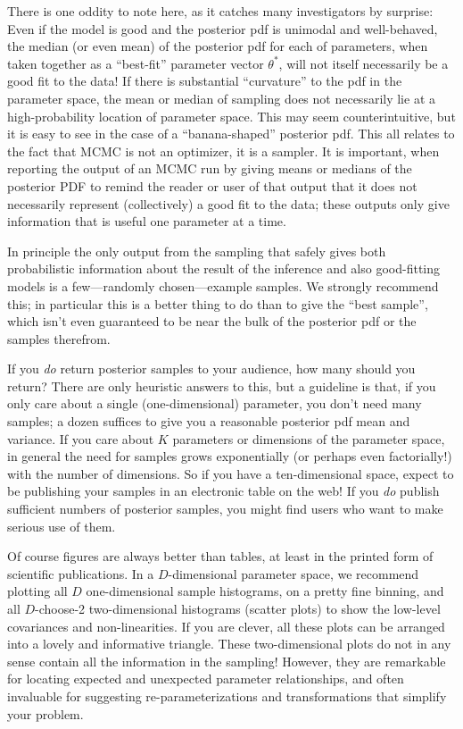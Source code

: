 \documentclass[12pt,twoside,pdftex]{article}
\newcommand{\pars}{\theta}
\begin{document}
There is one oddity to note here, as it catches many investigators by
surprise:
Even if the model is good and the posterior pdf is unimodal and well-behaved,
the median (or even mean) of the posterior pdf for each of parameters,
when taken together as a ``best-fit'' parameter vector $\pars^\ast$,
will not itself necessarily be a good fit to the data!
If there is substantial ``curvature'' to the pdf in the parameter
space, the mean or median of sampling does not necessarily lie at a
high-probability location of parameter space.
This may seem counterintuitive, but it is easy to see in the case of a
``banana-shaped'' posterior pdf.
This all relates to the fact that MCMC is not an optimizer, it is a
sampler.
It is important, when reporting the output of an MCMC run by giving
means or medians of the posterior PDF to remind the reader or user of
that output that it does not necessarily represent (collectively) a
good fit to the data; these outputs only give information that is
useful one parameter at a time.

In principle the only output from the sampling that safely gives both
probabilistic information about the result of the inference and also
good-fitting models is a few---randomly chosen---example samples.
We strongly recommend this;
in particular this is a better thing to do
than to give the ``best sample'', which isn't even guaranteed to be
near the bulk of the posterior pdf or the samples therefrom.

If you \emph{do} return posterior samples to your audience, how many
should you return?
There are only heuristic answers to this, but a guideline is that, if
you only care about a single (one-dimensional) parameter, you don't
need many samples; a dozen suffices to give you a reasonable posterior
pdf mean and variance.
If you care about $K$ parameters or dimensions of the parameter space,
in general the need for samples grows exponentially (or perhaps even
factorially!) with the number of dimensions.
So if you have a ten-dimensional space, expect to be publishing your
samples in an electronic table on the web!
If you \emph{do} publish sufficient numbers of posterior samples, you
might find users who want to make serious use of them.

Of course figures are always better than tables, at least in the
printed form of scientific publications.
In a $D$-dimensional parameter space, we recommend plotting all $D$
one-dimensional sample histograms, on a pretty fine binning, and all
$D$-choose-2 two-dimensional histograms (scatter plots) to show the
low-level covariances and non-linearities.
If you are clever, all these plots can be arranged into a lovely and
informative triangle.
These two-dimensional plots do not in any sense contain all the
information in the sampling!  However, they are remarkable for
locating expected and unexpected parameter relationships, and often
invaluable for suggesting re-parameterizations and transformations
that simplify your problem.
\end{document}
